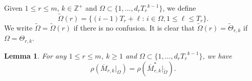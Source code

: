 \documentclass[11pt]{amsart}
\newtheorem{lem}[thm]{Lemma}
\theoremstyle{definition}
\theoremstyle{remark}
\numberwithin{equation}{section}
\newcommand{\upM}{{\overline{M}}}
\def\wdt{\widetilde}
\begin{document}


Given $1\leq r\leq m$, $k \in \mathbb{Z}^+$ and $\Omega \subset \{ 1 ,\ldots, d_r {T_r}^{k-1}\}$, we define 
\[
  \wdt{\Omega}(r)= 
  \big\{ (i-1)T_r+\ell : \, i \in \Omega , 1 \leq \ell \leq T_r    \}.
\]
We write $\wdt{\Omega}=\wdt{\Omega}(r)$ if there is no confusion. It is clear that $\wdt{\Omega}(r)=\wdt{\Theta}_{r,k}$ if $\Omega=\Theta_{r,k}$.



\begin{lem}\label{lem:3-rho-key-lem-1}
For any $1\leq r\leq m$, $k \geq 1$ and $\Omega \subset \{ 1, \ldots, d_r {T_r}^{k-1} \}$, we
have
$$ \rho(\upM_{r,k}|_{\Omega}) = \rho( \upM_{r,k}^*|_{\wdt\Omega}).  $$
\end{lem}
\end{document}
